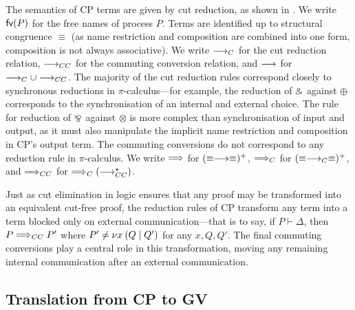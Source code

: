 \documentclass[oribibl,orivec,envcountsame]{llncs}
\begin{document}
The semantics of CP terms are given by cut reduction, as shown in .  We write
$\mathsf{fv}(P)$ for the free names of process $P$.  Terms are identified up to structural congruence
$\equiv$ (as name restriction and composition are combined into one form, composition is not always
associative). We write $\longrightarrow_C$ for the cut reduction relation, $\longrightarrow_{CC}$ for the commuting conversion
relation, and $\longrightarrow$ for $\longrightarrow_C \cup \longrightarrow_{CC}$.  The majority of the cut reduction rules correspond
closely to synchronous reductions in $\pi$-calculus---for example, the reduction of $\mathbin\binampersand$ against
$\oplus$ corresponds to the synchronisation of an internal and external choice.  The rule for
reduction of $\mathbin\bindnasrepma$ against $\otimes$ is more complex than synchronisation of input and output, as
it must also manipulate the implicit name restriction and composition in CP's output term. The
commuting conversions do not correspond to any reduction rule in $\pi$-calculus. We write $\Longrightarrow$
for $(\equiv\longrightarrow\equiv)^+$, $\Longrightarrow_C$ for $(\equiv\longrightarrow_C\equiv)^+$, and $\Longrightarrow_{CC}$ for
$\Longrightarrow_C(\longrightarrow_{CC}^\star)$.

Just as cut elimination in logic ensures that any proof may be transformed into an equivalent
cut-free proof, the reduction rules of CP transform any term into a term blocked only on external
communication---that is to say, if $P \vdash \Delta$, then $P \Longrightarrow_{CC} P'$ where $P' \not= \nu x \: (Q \mid Q')$ for any $x,Q,Q'$. The final commuting conversions play a central role in this
transformation, moving any remaining internal communication after an external communication.

\subsection{Translation from CP to GV}\label{sec:togv}
\end{document}
